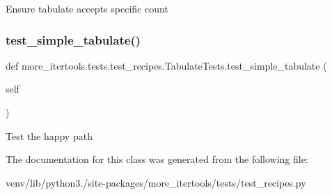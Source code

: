 \begin{DoxyVerb}Ensure tabulate accepts specific count\end{DoxyVerb}
 \mbox{\label{classmore__itertools_1_1tests_1_1test__recipes_1_1_tabulate_tests_ad172dc88d66f6eb9b466c5d08fcf176c}} 
\subsubsection{\texorpdfstring{test\+\_\+simple\+\_\+tabulate()}{test\_simple\_tabulate()}}
{\footnotesize\ttfamily def more\+\_\+itertools.\+tests.\+test\+\_\+recipes.\+Tabulate\+Tests.\+test\+\_\+simple\+\_\+tabulate (\begin{DoxyParamCaption}\item[{}]{self }\end{DoxyParamCaption})}

\begin{DoxyVerb}Test the happy path\end{DoxyVerb}
 

The documentation for this class was generated from the following file\+:\begin{DoxyCompactItemize}
\item 
venv/lib/python3./site-\/packages/more\+\_\+itertools/tests/test\+\_\+recipes.\+py\end{DoxyCompactItemize}
